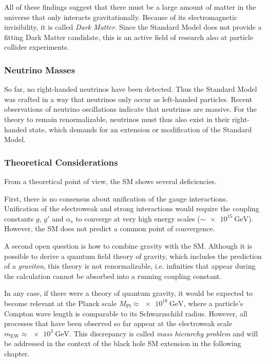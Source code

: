 All of these findings suggest that there must be a large amount of matter in the universe that only interacts gravitationally. Because of its electromagnetic invisibility, it is called \emph{Dark Matter}.
Since the Standard Model does not provide a fitting Dark Matter candidate, this is an active field of research also at particle collider experiments.

\subsubsection{Neutrino Masses}
So far, no right-handed neutrinos have been detected. Thus the Standard Model was crafted in a way that neutrinos only occur as left-handed particles.
Recent observations of neutrino oscillations\cite{KamLAND:ReactorAntineutrinoMeasurement,DoubleChooz:Improvedmeasurementsneutrino,IceCube:Determiningneutrinooscillation,DayaBay:NewMeasurementAntineutrino} indicate that neutrinos are massive. For the theory to remain renormalizable, neutrinos must thus also exist in their right-handed state\cite{Klinkhamer:NeutrinomassStandard}, which demands for an extension or modification of the Standard Model.

\pagebreak

\subsubsection{Theoretical Considerations}
From a theoretical point of view, the \ac{SM} shows several deficiencies. 

First, there is no consensus about unification of the gauge interactions. Unification of the electroweak and strong interactions would require the coupling constants $g$, $g'$ and $\alpha_s$ to converge at very high energy scales ($\sim \SI{e15}{\GeV}$). However, the \acl{SM} does not predict a common point of convergence\cite{Amaldi:Comparisongrandunified}. 

A second open question is how to combine gravity with the \acl{SM}. Although it is possible to derive a quantum field theory of gravity, which includes the prediction of a \emph{graviton}, this theory is not renormalizable, i.e. infinities that appear during the calculation cannot be absorbed into a running coupling constant\cite{Donoghue:IntroductionEffectiveField}.

In any case, if there were a theory of quantum gravity, it would be expected to become relevant at the Planck scale $M_\text{Pl} \approx \SI{e18}{\GeV}$, where a particle's Compton wave length is comparable to its Schwarzschild radius. However, all processes that have been observed so far appear at the electroweak scale $m_\text{EW} \approx \SI{e3}{\GeV}$. This discrepancy is called \emph{mass hierarchy problem}\cite{Amaldi:Comparisongrandunified} and will be addressed in the context of the black hole \ac{SM} extension in the following chapter.

